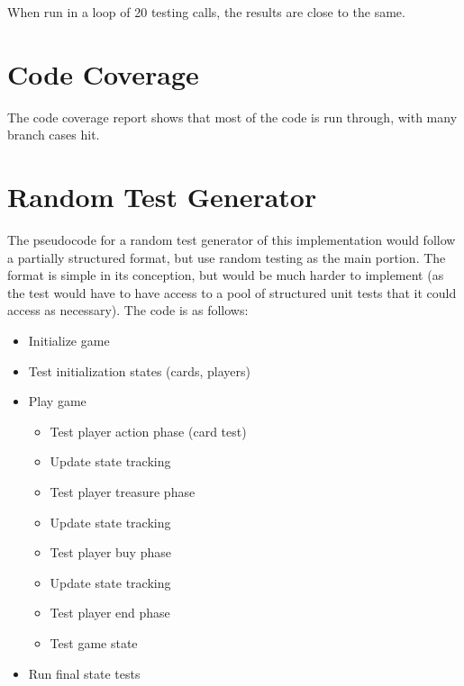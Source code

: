\documentclass[letterpaper,10pt,onecolumn,draftclsnofoot]{IEEEtran}
\begin{document}
When run in a loop of 20 testing calls, the results are close to the same.

\section{Code Coverage}
The code coverage report shows that most of the code is run through, with many branch cases hit.


\section{Random Test Generator}
The pseudocode for a random test generator of this implementation would follow a partially structured format, but use random testing as the main portion. The format is simple in its conception, but would be much harder to implement (as the test would have to have access to a pool of structured unit tests that it could access as necessary). The code is as follows:

\begin{itemize}
\item Initialize game
\item Test initialization states (cards, players)
\item Play game
\begin{itemize}
	\item Test player action phase (card test)
	\item Update state tracking
	\item Test player treasure phase
	\item Update state tracking
	\item Test player buy phase
	\item Update state tracking
	\item Test player end phase
	\item Test game state
\end{itemize}
\item Run final state tests
\end{itemize}
\end{document}
